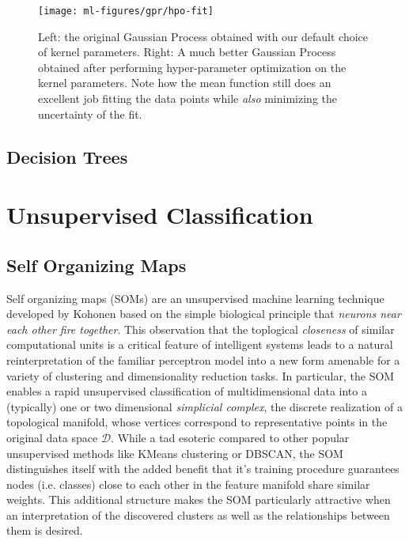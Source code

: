 \begin{figure}[h]
  \centering
  \texttt{[image: ml-figures/gpr/hpo-fit]}
  \caption{Left: the original Gaussian Process obtained with our default choice of kernel parameters. Right: A much better Gaussian Process obtained after performing hyper-parameter optimization on the kernel parameters. Note how the mean function still does an excellent job fitting the data points while \textit{also} minimizing the uncertainty of the fit.}
  \label{fig:gpr-fit-comparison}
\end{figure}



\subsection{Decision Trees}



\section{Unsupervised Classification}


\subsection{Self Organizing Maps}

Self organizing maps (SOMs) are an unsupervised machine learning technique developed by Kohonen \cite{kohonen-original} based on the simple biological principle that \textit{neurons near each other fire together}. This observation that the toplogical \textit{closeness} of similar computational units is a critical feature of intelligent systems leads to a natural reinterpretation of the familiar perceptron model into a new form amenable for a variety of clustering and dimensionality reduction tasks. In particular, the SOM enables a rapid unsupervised classification of multidimensional data into a (typically) one or two dimensional \textit{simplicial complex}, the discrete realization of a topological manifold, whose vertices correspond to representative points in the original data space $\mathcal{D}$. While a tad esoteric compared to other popular unsupervised methods like KMeans clustering or DBSCAN, the SOM distinguishes itself with the added benefit that it's training procedure guarantees nodes (i.e. classes) close to each other in the feature manifold share similar weights. This additional structure makes the SOM particularly attractive when an interpretation of the discovered clusters as well as the relationships between them is desired.

